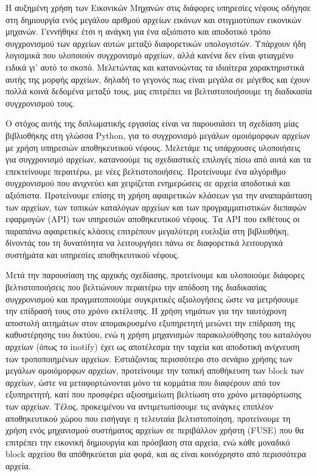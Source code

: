 
\begin{abstractgr}
  Η αυξημένη χρήση των Εικονικών Μηχανών στις διάφορες υπηρεσίες νέφους οδήγησε στη δημιουργία ενός μεγάλου αριθμού αρχείων εικόνων και στιγμιοτύπων εικονικών μηχανών. Γεννήθηκε έτσι η ανάγκη για ένα αξιόπιστο και αποδοτικό τρόπο συγχρονισμού των αρχείων αυτών μεταξύ διαφορετικών υπολογιστών. Υπάρχουν ήδη λογισμικά που υλοποιούν συγχρονισμό αρχείων, αλλά κανένα δεν είναι φτιαγμένο ειδικά γι' αυτό το σκοπό. Μελετώντας και κατανοώντας τα ιδιαίτερα χαρακτηριστικά αυτής της μορφής αρχείων, δηλαδή το γεγονός πως είναι μεγάλα σε μέγεθος και έχουν πολλά κοινά δεδομένα μεταξύ τους, μας επιτρέπει να βελτιστοποιήσουμε τη διαδικασία συγχρονισμού τους.

  Ο στόχος αυτής της διπλωματικής εργασίας είναι να παρουσιάσει τη σχεδίαση μίας βιβλιοθήκης στη γλώσσα Python, για το συγχρονισμό μεγάλων ομοιόμορφων αρχείων με χρήση υπηρεσιών αποθηκευτικού νέφους. Μελετάμε τις υπάρχουσες υλοποιήσεις για συγχρονισμό αρχείων, κατανοούμε τις σχεδιαστικές επιλογές πίσω από αυτά και τα επεκτείνουμε περαιτέρω, με νέες βελτιστοποιήσεις. Προτείνουμε ένα αλγόριθμο συγχρονισμού που ανιχνεύει και χειρίζεται ενημερώσεις σε αρχεία αποδοτικά και αξιόπιστα. Προτείνουμε επίσης τη χρήση αφαιρετικών κλάσεων για την αναπαράσταση των αρχείων, των τοπικών καταλόγων αρχείων και των προγραμματιστικών διεπαφών εφαρμογών (API) των υπηρεσιών αποθηκευτικού νέφους. Τα API που εκθέτους οι παραπάνω αφαιρετικές κλάσεις επιτρέπουν μεγαλύτερη ευελιξία στη βιβλιοθήκη, δίνοντάς του τη δυνατότητα να λειτουργήσει πάνω σε διαφορετικά λειτουργικά συστήμάτα και υπηρεσίες αποθηκευτικού νέφους.

  Μετά την παρουσίαση της αρχικής σχεδίασης, προτείνουμε και υλοποιούμε διάφορες βελτιστοποιήσεις που βελτιώνουν περαιτέρω την απόδοση της διαδικασίας συγχρονισμού και πραγματοποιούμε συγκριτικές αξιολογήσεις ώστε να μετρήσουμε την επίδρασή τους στο χρόνο εκτέλεσης. Η χρήση νημάτων για την ταυτόχρονη αποστολή αιτημάτων στον απομακρυσμένο εξυπηρετητή μειώνει την επίδραση της καθυστέρησης του δικτύου, ενώ η χρήση μηχανισμών παρακολούθησης του καταλόγου αρχείων (όπως το inotify) έχει ως αποτέλεσμα την ταχεία και αποδοτική ανίχνευση των τροποποιημένων αρχείων. Εστιάζοντας περισσότερο στο σενάριο χρήσης των μεγάλων ομοιόμορφων αρχείων, προτείνουμε την τοπική αποθήκευση των block των αρχείων, ώστε να μεταφορτώνονται μόνο τα κομμάτια που διαφέρουν από τον εξυπηρετητή, κατί που προσφέρει αξιοσημείωτη βελτίωση στο χρόνο μεταφόρτωσης των αρχείων. Τέλος, προκειμένου να αντιμετωπίσουμε τις ανάγκες επιπλέον αποθηκευτικού χώρου που εισήγαγε η τελευταία βελτιστοποίηση, προτείνουμε τη χρήση ενός μηχανισμού συστήματος αρχείων σε περιβάλλον χρήστη (FUSE) που θα επιτρέπει την εικονική δημιουργία και πρόσβαση στα αρχεία, ενώ κάθε μοναδικό block αρχείου θα απόθηκεύεται μία φορά, και ας είναι κοινόχρηστο από περισσότερα αρχεία.


\end{abstractgr}
